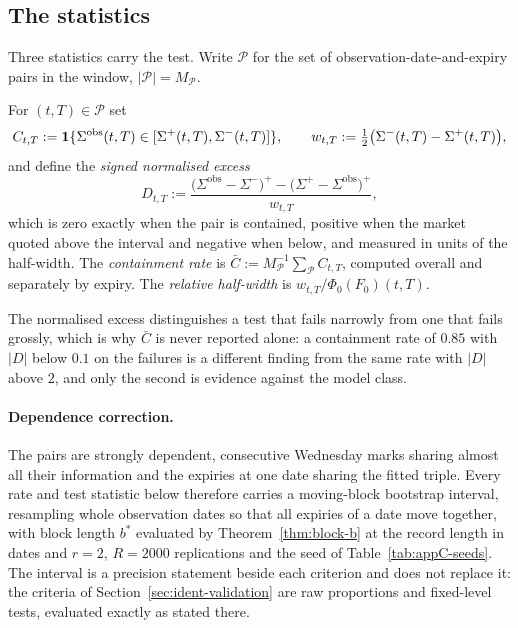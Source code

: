 \documentclass[../../../main.tex]{subfiles}
\begin{document}
\subsection{The statistics}

Three statistics carry the test. Write $\mathcal P$ for the set of observation-date-and-expiry pairs in the window, $|\mathcal P|=M_{\mathcal P}$.

\begin{definition}\label{def:usd-stats}
For $(t,T)\in\mathcal P$ set
\[
C_{t,T}:=\mathbf{1}\{\Sigma^{\mathrm{obs}}(t,T)\in[\Sigma^+(t,T),\Sigma^-(t,T)]\},\qquad
w_{t,T}:=\tfrac12\big(\Sigma^-(t,T)-\Sigma^+(t,T)\big),
\]
and define the \emph{signed normalised excess}
\[
D_{t,T}:=\frac{\big(\Sigma^{\mathrm{obs}}-\Sigma^-\big)^+-\big(\Sigma^+-\Sigma^{\mathrm{obs}}\big)^+}{w_{t,T}} ,
\]
which is zero exactly when the pair is contained, positive when the market quoted above the interval and negative when below, and measured in units of the half-width. The \emph{containment rate} is $\bar C:=M_{\mathcal P}^{-1}\sum_{\mathcal P}C_{t,T}$, computed overall and separately by expiry. The \emph{relative half-width} is $w_{t,T}/\Phi_0(F_0)(t,T)$.
\end{definition}

The normalised excess distinguishes a test that fails narrowly from one that fails grossly, which is why $\bar C$ is never reported alone: a containment rate of $0.85$ with $|D|$ below $0.1$ on the failures is a different finding from the same rate with $|D|$ above $2$, and only the second is evidence against the model class.

\paragraph{Dependence correction.} The pairs are strongly dependent, consecutive Wednesday marks sharing almost all their information and the expiries at one date sharing the fitted triple. Every rate and test statistic below therefore carries a moving-block bootstrap interval, resampling whole observation dates so that all expiries of a date move together, with block length $b^*$ evaluated by Theorem~\ref{thm:block-b} at the record length in dates and $r=2$, $R=2000$ replications and the seed of Table~\ref{tab:appC-seeds}. The interval is a precision statement beside each criterion and does not replace it: the criteria of Section~\ref{sec:ident-validation} are raw proportions and fixed-level tests, evaluated exactly as stated there.
\end{document}
